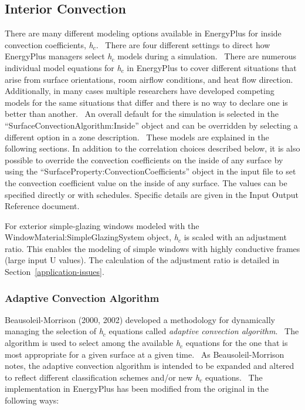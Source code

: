 \subsection{Interior Convection}\label{interior-convection}

There are many different modeling options available in EnergyPlus for inside convection coefficients, \emph{h\(_{c}\)}.~ There are four different settings to direct how EnergyPlus managers select \emph{h\(_{c}\)} models during a simulation.~ There are numerous individual model equations for \emph{h\(_{c}\)} in EnergyPlus to cover different situations that arise from surface orientations, room airflow conditions, and heat flow direction.~ Additionally, in many cases multiple researchers have developed competing models for the same situations that differ and there is no way to declare one is better than another.~ An overall default for the simulation is selected in the ``SurfaceConvectionAlgorithm:Inside'' object and can be overridden by selecting a different option in a zone description.~ These models are explained in the following sections. In addition to the correlation choices described below, it is also possible to override the convection coefficients on the inside of any surface by using the ``SurfaceProperty:ConvectionCoefficients'' object in the input file to set the convection coefficient value on the inside of any surface. The values can be specified directly or with schedules. Specific details are given in the Input Output Reference document.

For exterior simple-glazing windows modeled with the WindowMaterial:SimpleGlazingSystem
object, \emph{h\(_{c}\)} is scaled with an adjustment ratio. This enables the modeling
of simple windows with highly conductive frames (large input U values). The calculation
of the adjustment ratio is detailed in Section~\ref{application-issues}.

\subsubsection{Adaptive Convection Algorithm}\label{adaptive-convection-algorithm}

Beausoleil-Morrison (2000, 2002) developed a methodology for dynamically managing the selection of \emph{h\(_{c}\)} equations called \emph{adaptive convection algorithm}.~ The algorithm is used to select among the available \emph{h\(_{c}\)} equations for the one that is most appropriate for a given surface at a given time.~ As Beausoleil-Morrison notes, the adaptive convection algorithm is intended to be expanded and altered to reflect different classification schemes and/or new \emph{h\(_{c}\)} equations.~ The implementation in EnergyPlus has been modified from the original in the following ways:

